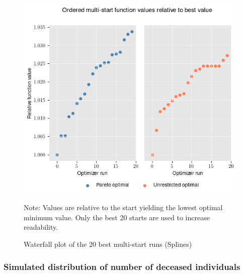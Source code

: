 \begin{figure}[h!]
\centering
\includegraphics[scale=0.53]{images/splines_waterfall.png}\\
\begin{flushleft}
\scriptsize{Note:} Values are relative to the start yielding the lowest optimal minimum value. Only the best 20 starts are used to increase readability. 
\end{flushleft}
\caption{Waterfall plot of the 20 best multi-start runs (Splines)}
\label{fig:results_splines_waterfall}
\end{figure}

\clearpage
\subsubsection{Simulated distribution of number of deceased individuals}
\label{A:simulated_distr}

